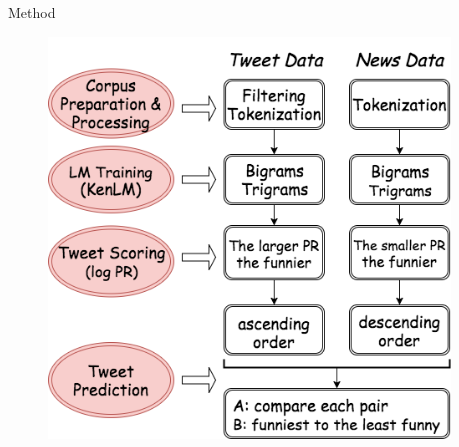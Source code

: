 \documentclass[final]{beamer}
\newlength{\onecolwid}
\newlength{\twocolwid}
\begin{document}
\begin{frame}[t]
\begin{columns}[t]
\begin{column}{\twocolwid}
\begin{columns}[t,totalwidth=\twocolwid] %

\begin{column}{\onecolwid}\vspace{-.6in} %


\begin{block}{Method}


\begin{figure}
\includegraphics[width=1.04\linewidth]{Method.png} 
\end{figure}



\end{block}


\end{column}


\begin{column}{\onecolwid}\vspace{-.6in} %




\end{column}
\end{columns}
\end{column}
\end{columns}
\end{frame}
\end{document}
